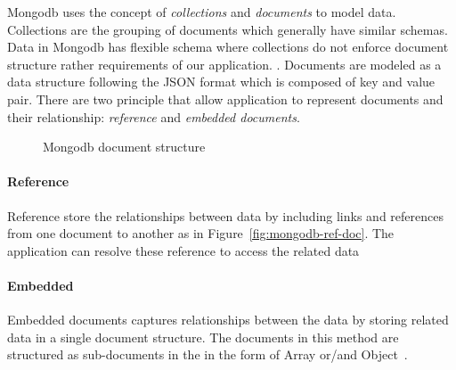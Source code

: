 
Mongodb uses the concept of \textit{collections} and \textit{documents} to model data. Collections are the grouping of documents which generally have similar schemas. Data in Mongodb has flexible schema where collections do not enforce document structure rather requirements of our application. .  Documents are modeled as a data structure following the JSON format which is composed of key and value pair. There are two principle that allow application to represent documents and their relationship: \textit{reference} and \textit{embedded documents}. 
\begin{figure}
	\centering
	\centering
	\caption{Mongodb document structure}
	\label{fig:mongodb-doc}
	 
\end{figure}

\paragraph{Reference}
	Reference store the relationships between data by including links and references from one document to another as in  Figure~\ref{fig:mongodb-ref-doc}. The application can resolve these reference to access the related data
\paragraph{Embedded}
	Embedded documents captures relationships between the data by storing related data in a single document structure. The documents in this method are structured as sub-documents in the in the form of Array or/and Object~\cite{nosql/comparision}. 
	
